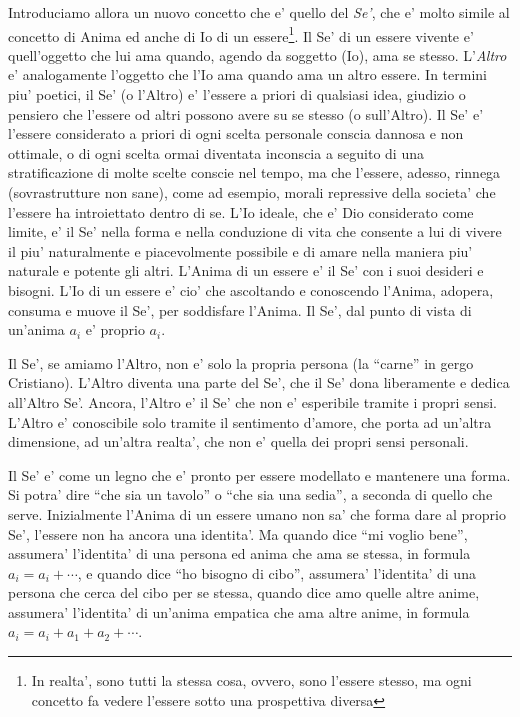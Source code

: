 Introduciamo allora un nuovo concetto che e' quello del \emph{Se'}, che e' molto simile al concetto di Anima ed anche di Io di un essere\footnote{In realta', sono tutti la stessa cosa, ovvero, sono l'essere stesso, ma ogni concetto fa vedere l'essere sotto una prospettiva diversa}. Il Se' di un essere vivente e' quell'oggetto che lui ama quando, agendo da soggetto (Io), ama se stesso. L'\emph{Altro} e' analogamente l'oggetto che l'Io ama quando ama un altro essere. In termini piu' poetici, il Se' (o l'Altro) e' l'essere a priori di qualsiasi idea, giudizio o pensiero che l'essere od altri possono avere su se stesso (o sull'Altro). Il Se' e' l'essere considerato a priori di ogni scelta personale conscia dannosa e non ottimale, o di ogni scelta ormai diventata inconscia a seguito di una stratificazione di molte scelte conscie nel tempo, ma che l'essere, adesso, rinnega (sovrastrutture non sane), come ad esempio, morali repressive della societa' che l'essere ha introiettato dentro di se. L'Io ideale, che e' Dio considerato come limite, e' il Se' nella forma e nella conduzione di vita che consente a lui di vivere il piu' naturalmente e piacevolmente possibile e di amare nella maniera piu' naturale e potente gli altri. L'Anima di un essere e' il Se' con i suoi desideri e bisogni. L'Io di un essere e' cio' che ascoltando e conoscendo l'Anima, adopera, consuma e muove il Se', per soddisfare l'Anima. Il Se', dal punto di vista di un'anima $a_i$ e' proprio $a_i$.

Il Se', se amiamo l'Altro, non e' solo la propria persona (la ``carne'' in gergo Cristiano). L'Altro diventa una parte del Se', che il Se' dona liberamente e dedica all'Altro Se'. Ancora, l'Altro e' il Se' che non e' esperibile tramite i propri sensi. L'Altro e' conoscibile solo tramite il sentimento d'amore, che porta ad un'altra dimensione, ad un'altra realta', che non e' quella dei propri sensi personali. 

Il Se' e' come un legno che e' pronto per essere modellato e mantenere una forma. Si potra' dire ``che sia un tavolo'' o ``che sia una sedia'', a seconda di quello che serve.  Inizialmente l'Anima di un essere umano non sa' che forma dare al proprio Se', l'essere non ha ancora una identita'. Ma quando dice ``mi voglio bene'', assumera' l'identita' di una persona ed anima che ama se stessa, in formula $a_i=a_i+\cdots$, e quando dice ``ho bisogno di cibo'', assumera' l'identita' di una persona che cerca del cibo per se stessa, quando dice amo quelle altre anime, assumera' l'identita' di un'anima empatica che ama altre anime, in formula $a_i=a_i+a_1+a_2+\cdots$. 

